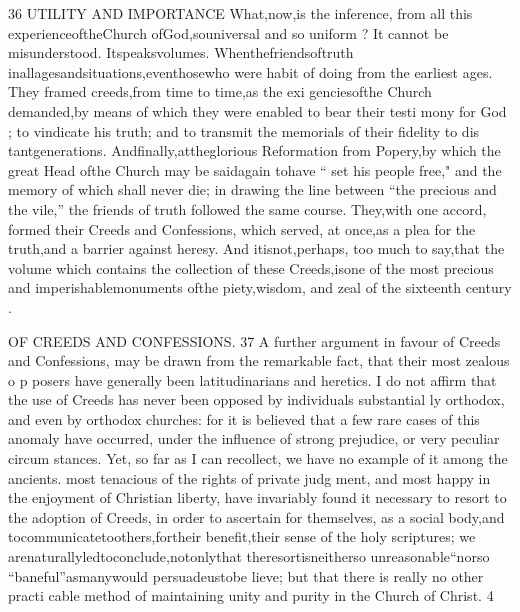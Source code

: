 \documentclass[
]{book}
\begin{document}
36 UTILITY AND IMPORTANCE
What,now,is the inference, from all this experienceoftheChurch ofGod,souniversal and so uniform ? It cannot be misunderstood.
Itspeaksvolumes. Whenthefriendsoftruth inallagesandsituations,eventhosewho were
habit of doing from the earliest ages. They framed creeds,from time to time,as the exi
genciesofthe Church demanded,by means of which they were enabled to bear their testi mony for God ; to vindicate his truth; and to transmit the memorials of their fidelity to dis tantgenerations. Andfinally,attheglorious Reformation from Popery,by which the great Head ofthe Church may be saidagain tohave
`` set his people free," and the memory of
which shall never die; in drawing the line between ``the precious and the vile,'' the friends of truth followed the same course.
They,with one accord, formed their Creeds
and Confessions, which served, at once,as a
plea for the truth,and a barrier against heresy.
And itisnot,perhaps, too much to say,that the volume which contains the collection of
these Creeds,isone of the most precious and
imperishablemonuments ofthe piety,wisdom, and zeal of the sixteenth century .

OF CREEDS AND CONFESSIONS. 37
A further argument in favour of Creeds and Confessions, may be drawn from the remarkable fact, that their most zealous o p posers have generally been latitudinarians and
heretics.
I do not affirm that the use of Creeds has
never been opposed by individuals substantial ly orthodox, and even by orthodox churches: for it is believed that a few rare cases of this anomaly have occurred, under the influence of strong prejudice, or very peculiar circum stances. Yet, so far as I can recollect, we have no example of it among the ancients.
most tenacious of the rights of private judg ment, and most happy in the enjoyment of
Christian liberty, have invariably found it necessary to resort to the adoption of Creeds,
in order to ascertain for themselves, as a social body,and tocommunicatetoothers,fortheir benefit,their sense of the holy scriptures;
we arenaturallyledtoconclude,notonlythat theresortisneitherso unreasonable``norso
``baneful''asmanywould persuadeustobe lieve; but that there is really no other practi cable method of maintaining unity and purity in the Church of Christ.
4
\end{document}
